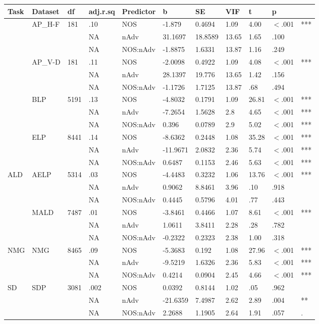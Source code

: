 \begin{table}[ht]
\centering
\begingroup\normalsize
\begin{tabular}{lllllllllll}
  \hline
Task & Dataset & df & adj.r.sq & Predictor & b & SE & VIF & t & p &  \\ 
  \hline
 & AP\_H-F & 181 & .10 & NOS & -1.879 & 0.4694 & 1.09 & 4.00 & $<$.001 & *** \\ 
   &  &  & NA & nAdv & 31.1697 & 18.8589 & 13.65 & 1.65 & .100 &   \\ 
   &  &  & NA & NOS:nAdv & -1.8875 & 1.6331 & 13.87 & 1.16 & .249 &   \\ 
   & AP\_V-D & 181 & .11 & NOS & -2.0098 & 0.4922 & 1.09 & 4.08 & $<$.001 & *** \\ 
   &  &  & NA & nAdv & 28.1397 & 19.776 & 13.65 & 1.42 & .156 &   \\ 
   &  &  & NA & NOS:nAdv & -1.1726 & 1.7125 & 13.87 & .68 & .494 &   \\ 
   & BLP & 5191 & .13 & NOS & -4.8032 & 0.1791 & 1.09 & 26.81 & $<$.001 & *** \\ 
   &  &  & NA & nAdv & -7.2654 & 1.5628 & 2.8 & 4.65 & $<$.001 & *** \\ 
   &  &  & NA & NOS:nAdv & 0.396 & 0.0789 & 2.9 & 5.02 & $<$.001 & *** \\ 
   & ELP & 8441 & .14 & NOS & -8.6362 & 0.2448 & 1.08 & 35.28 & $<$.001 & *** \\ 
   &  &  & NA & nAdv & -11.9671 & 2.0832 & 2.36 & 5.74 & $<$.001 & *** \\ 
   &  &  & NA & NOS:nAdv & 0.6487 & 0.1153 & 2.46 & 5.63 & $<$.001 & *** \\ 
  ALD & AELP & 5314 & .03 & NOS & -4.4483 & 0.3232 & 1.06 & 13.76 & $<$.001 & *** \\ 
   &  &  & NA & nAdv & 0.9062 & 8.8461 & 3.96 & .10 & .918 &   \\ 
   &  &  & NA & NOS:nAdv & 0.4445 & 0.5796 & 4.01 & .77 & .443 &   \\ 
   & MALD & 7487 & .01 & NOS & -3.8461 & 0.4466 & 1.07 & 8.61 & $<$.001 & *** \\ 
   &  &  & NA & nAdv & 1.0611 & 3.8411 & 2.28 & .28 & .782 &   \\ 
   &  &  & NA & NOS:nAdv & -0.2322 & 0.2323 & 2.38 & 1.00 & .318 &   \\ 
  NMG & NMG & 8465 & .09 & NOS & -5.3683 & 0.192 & 1.08 & 27.96 & $<$.001 & *** \\ 
   &  &  & NA & nAdv & -9.5219 & 1.6326 & 2.36 & 5.83 & $<$.001 & *** \\ 
   &  &  & NA & NOS:nAdv & 0.4214 & 0.0904 & 2.45 & 4.66 & $<$.001 & *** \\ 
  SD & SDP & 3081 & .002 & NOS & 0.0392 & 0.8144 & 1.02 & .05 & .962 &   \\ 
   &  &  & NA & nAdv & -21.6359 & 7.4987 & 2.62 & 2.89 & .004 & ** \\ 
   &  &  & NA & NOS:nAdv & 2.2688 & 1.1905 & 2.64 & 1.91 & .057 & . \\ 
   \hline
\end{tabular}
\endgroup
\end{table}

